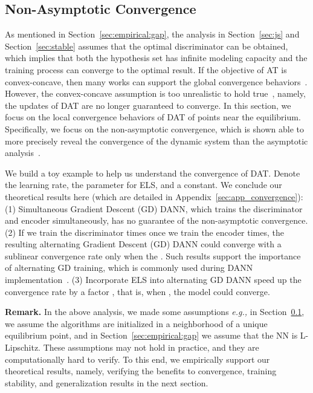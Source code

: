 \documentclass{article} \usepackage{iclr2023_conference,times}
\newcommand{\ls}[0]{ELS\xspace}
\newcommand{\eg}[0]{\textit{e.g., }}
\begin{document}
\subsection{Non-Asymptotic Convergence}\label{sec:convergence}
\vspace{-0.15cm}
As mentioned in Section~\ref{sec:empirical:gap}, the analysis in Section~\ref{sec:js} and Section~\ref{sec:stable} assumes that the optimal discriminator can be obtained, which implies that both the hypothesis set has infinite modeling capacity and the training process can converge to the optimal result. If the objective of AT is convex-concave, then many works can support the global convergence behaviors~\citep{nowozin2016f,yadav2017stabilizing}. However, the convex-concave assumption is too unrealistic to hold true~\citep{nie2020towards,nagarajan2017gradient}, namely, the updates of DAT are no longer guaranteed to converge. In this section, we focus on the local convergence behaviors of DAT of points near the equilibrium. Specifically, we focus on the non-asymptotic convergence, which is shown able to more precisely reveal the convergence of the dynamic system than the asymptotic analysis~\citep{nie2020towards}. 


We build a toy example to help us understand the convergence of DAT. Denote  the learning rate,  the parameter for \ls, and  a constant. We conclude our theoretical results here (which are detailed in Appendix~\ref{sec:app_convergence}): (1) Simultaneous Gradient Descent (GD) DANN, which trains the discriminator and encoder simultaneously, has no guarantee of the non-asymptotic convergence. (2) If we train the discriminator  times once we train the encoder  times, the resulting alternating Gradient Descent (GD) DANN could converge with a sublinear convergence rate only when the . Such results support the importance of alternating GD training, which is commonly used during DANN implementation~\citep{gulrajani2021in}. (3) Incorporate \ls into alternating GD DANN speed up the convergence rate by a factor , that is, when , the model could converge.



\textbf{Remark.} In the above analysis, we made some assumptions \eg in Section~\ref{sec:convergence}, we assume the algorithms are initialized in a neighborhood of a unique equilibrium point, and in Section~\ref{sec:empirical:gap} we assume that the NN is L-Lipschitz. These assumptions may not hold in practice, and they are computationally hard to verify. To this end, we empirically support our theoretical results, namely, verifying the benefits to convergence, training stability, and generalization results in the next section.
\end{document}
